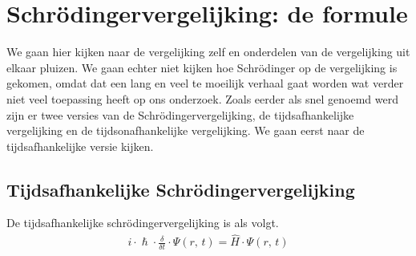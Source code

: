 \documentclass[11pt,fleqn]{book} %
\begin{document}
\section{Schrödingervergelijking: de formule}
We gaan hier kijken naar de vergelijking zelf en onderdelen van de vergelijking uit elkaar pluizen. We gaan echter niet kijken hoe Schrödinger op de vergelijking is gekomen, omdat dat een lang en veel te moeilijk verhaal gaat worden wat verder niet veel toepassing heeft op ons onderzoek. Zoals eerder als snel genoemd werd zijn er twee versies van de Schrödingervergelijking, de tijdsafhankelijke vergelijking en de tijdsonafhankelijke vergelijking. We gaan eerst naar de tijdsafhankelijke versie kijken.

\subsection{Tijdsafhankelijke Schrödingervergelijking}
\begin{definition}\label{eq:tsv}
De tijdsafhankelijke schrödingervergelijking is als volgt.
\begin{align*}
i \cdot \hslash \cdot \frac{\delta}{\delta t} \cdot \Psi(r,\,t) = \hat{H} \cdot \Psi(r,\,t)
\end{align*}
\end{definition}
\end{document}

